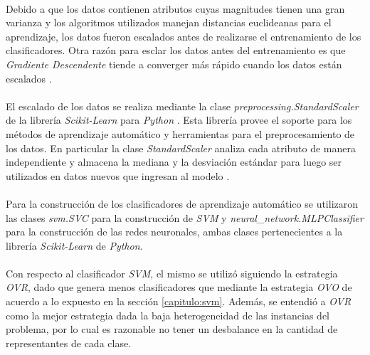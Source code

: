 \paragraph{} Debido a que los datos contienen atributos cuyas magnitudes tienen una gran varianza y los algoritmos utilizados manejan distancias euclideanas para el aprendizaje, los datos fueron escalados antes de realizarse el entrenamiento de los clasificadores.
Otra razón para esclar los datos antes del entrenamiento es que \textit{Gradiente Descendente} tiende a converger más rápido cuando los datos están escalados \cite{gradiente-descendente-escalado}.

\paragraph{} El escalado de los datos se realiza mediante la clase \textit{preprocessing.StandardScaler} de la librería \textit{Scikit-Learn} para \textit{Python} \cite{scikit-learn}.
Esta librería provee el soporte para los métodos de aprendizaje automático y herramientas para el preprocesamiento de los datos.
En particular la clase \textit{StandardScaler} analiza cada atributo de manera independiente y almacena la mediana y la desviación estándar para luego ser utilizados en datos nuevos que ingresan al modelo \cite{StandardScaler-scikit-learn}.

\paragraph{} Para la construcción de los clasificadores de aprendizaje automático se utilizaron las clases \textit{svm.SVC} para la construcción de \textit{SVM} y \textit{neural\_network.MLPClassifier} para la construcción de las redes neuronales, ambas clases pertenecientes a la librería \textit{Scikit-Learn} de \textit{Python}.

\paragraph{} Con respecto al clasificador \textit{SVM}, el mismo se utilizó siguiendo la estrategia \textit{OVR}, dado que genera menos clasificadores que mediante la estrategia \textit{OVO} de acuerdo a lo expuesto en la sección \ref{capitulo:svm}.
Además, se entendió a \textit{OVR} como la mejor estrategia dada la baja heterogeneidad de las instancias del problema, por lo cual es razonable no tener un desbalance en la cantidad de representantes de cada clase.

